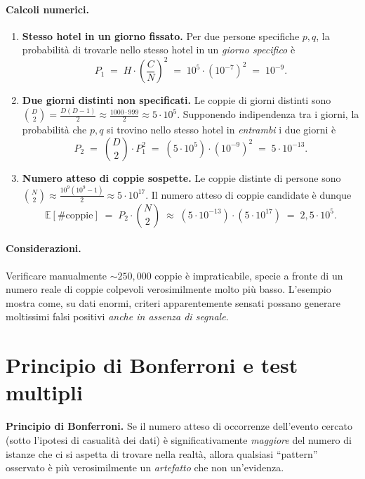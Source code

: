 \paragraph{Calcoli numerici.}
\begin{enumerate}
  \item \textbf{Stesso hotel in un giorno fissato.} Per due persone specifiche $p,q$, la probabilità di trovarle nello stesso hotel in un \emph{giorno specifico} è
  \[
    P_1 \;=\; H \cdot \left(\frac{C}{N}\right)^2 \;=\; 10^5 \cdot (10^{-7})^2 \;=\; 10^{-9}.
  \]
  \item \textbf{Due giorni distinti non specificati.} Le coppie di giorni distinti sono $\binom{D}{2} = \frac{D(D-1)}{2} \approx \frac{1000\cdot 999}{2} \approx 5\cdot 10^5$. Supponendo indipendenza tra i giorni, la probabilità che $p,q$ si trovino nello stesso hotel in \emph{entrambi} i due giorni è
  \[
    P_2 \;=\; \binom{D}{2}\cdot P_1^2 \;=\; \left(5\cdot 10^5\right)\cdot (10^{-9})^2 \;=\; 5\cdot 10^{-13}.
  \]
  \item \textbf{Numero atteso di coppie sospette.} Le coppie distinte di persone sono $\binom{N}{2}\approx \frac{10^9(10^9-1)}{2}\approx 5\cdot 10^{17}$. Il numero atteso di coppie candidate è dunque
  \[
    \mathbb{E}[\#\text{coppie}] \;=\; P_2 \cdot \binom{N}{2} \;\approx\; \left(5\cdot 10^{-13}\right)\cdot \left(5\cdot 10^{17}\right) \;=\; 2{,}5\cdot 10^{5}.
  \]
\end{enumerate}

\paragraph{Considerazioni.} Verificare manualmente $\sim 250{,}000$ coppie è impraticabile, specie a fronte di un numero reale di coppie colpevoli verosimilmente molto più basso. L'esempio mostra come, su dati enormi, criteri apparentemente sensati possano generare moltissimi falsi positivi \emph{anche in assenza di segnale}.

\section{Principio di Bonferroni e test multipli}\label{sec:bonferroni}
\textbf{Principio di Bonferroni.} Se il numero atteso di occorrenze dell'evento cercato (sotto l'ipotesi di casualità dei dati) è significativamente \emph{maggiore} del numero di istanze che ci si aspetta di trovare nella realtà, allora qualsiasi ``pattern'' osservato è più verosimilmente un \emph{artefatto} che non un'evidenza.
%
